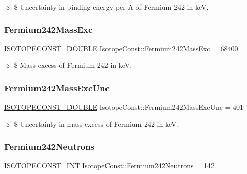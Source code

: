\$ \$ Uncertainty in binding energy per A of Fermium-\/242 in keV. \mbox{\label{group___isotope_const-_fermium-_fm242_gab0e70e2ff6352c243e93101c7f06bc91}} 
\subsubsection{\texorpdfstring{Fermium242\+Mass\+Exc}{Fermium242MassExc}}
{\footnotesize\ttfamily \mbox{\hyperlink{group___isotope_const-_macros_ga8f45a7272ce02c0b4c65c44636ed719a}{I\+S\+O\+T\+O\+P\+E\+C\+O\+N\+S\+T\+\_\+\+D\+O\+U\+B\+LE}} Isotope\+Const\+::\+Fermium242\+Mass\+Exc = 68400}

\$ \$ Mass excess of Fermium-\/242 in keV. \mbox{\label{group___isotope_const-_fermium-_fm242_gad1e05b8c17b6737ec32d075ee09e94ec}} 
\subsubsection{\texorpdfstring{Fermium242\+Mass\+Exc\+Unc}{Fermium242MassExcUnc}}
{\footnotesize\ttfamily \mbox{\hyperlink{group___isotope_const-_macros_ga8f45a7272ce02c0b4c65c44636ed719a}{I\+S\+O\+T\+O\+P\+E\+C\+O\+N\+S\+T\+\_\+\+D\+O\+U\+B\+LE}} Isotope\+Const\+::\+Fermium242\+Mass\+Exc\+Unc = 401}

\$ \$ Uncertainty in mass excess of Fermium-\/242 in keV. \mbox{\label{group___isotope_const-_fermium-_fm242_gaef2329c2936f50912dbbb7a69b75b5c8}} 
\subsubsection{\texorpdfstring{Fermium242\+Neutrons}{Fermium242Neutrons}}
{\footnotesize\ttfamily \mbox{\hyperlink{group___isotope_const-_macros_ga5f18360b3e99483a35c32d789e62621c}{I\+S\+O\+T\+O\+P\+E\+C\+O\+N\+S\+T\+\_\+\+I\+NT}} Isotope\+Const\+::\+Fermium242\+Neutrons = 142}

